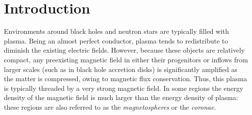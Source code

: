 \chapter{Introduction}

Environments around black holes and neutron stars are typically filled with plasma. Being an almost perfect conductor, plasma tends to redistribute to diminish the existing electric fields. However, because these objects are relatively compact, any preexisting magnetic field in either their progenitors or inflows from larger scales (such as in black hole accretion disks) is significantly amplified as the matter is compressed, owing to magnetic flux conservation. Thus, this plasma is typically threaded by a very strong magnetic field. In some regions the energy density of the magnetic field is much larger than the energy density of plasma: these regions are also referred to as the \emph{magnetospheres} or the \emph{coronae}.


